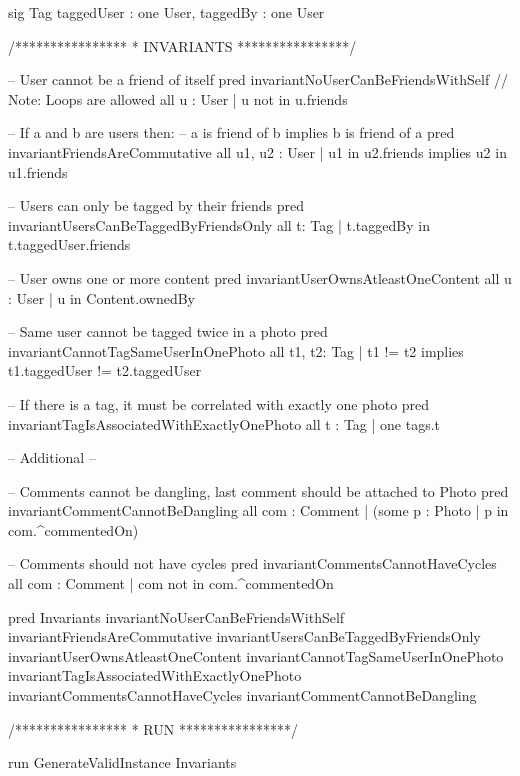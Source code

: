 \begin{enumerate}
\begin{alloy}
sig Tag {
    taggedUser : one User,
    taggedBy : one User
}

/****************
 * INVARIANTS 
 ****************/

-- User cannot be a friend of itself
pred invariantNoUserCanBeFriendsWithSelf {
  // Note: Loops are allowed
  all u : User | u not in u.friends
}

-- If a and b are users then:
-- a is friend of b implies b is friend of a
pred invariantFriendsAreCommutative {
  all u1, u2 : User | u1 in u2.friends implies u2 in u1.friends
}

-- Users can only be tagged by their friends
pred invariantUsersCanBeTaggedByFriendsOnly {
  all  t: Tag | t.taggedBy in t.taggedUser.friends
}

-- User owns one or more content
pred invariantUserOwnsAtleastOneContent {
  all u : User | u in Content.ownedBy
}

-- Same user cannot be tagged twice in a photo
pred invariantCannotTagSameUserInOnePhoto {
  all t1, t2: Tag | t1 != t2 implies t1.taggedUser != t2.taggedUser 
}

-- If there is a tag, it must be correlated with exactly one photo
pred invariantTagIsAssociatedWithExactlyOnePhoto {
  all t : Tag | one tags.t
}

-- Additional --

-- Comments cannot be dangling, last comment should be attached to Photo
pred invariantCommentCannotBeDangling {
  all com : Comment | (some p : Photo | p in com.^commentedOn)
}

-- Comments should not have cycles
pred invariantCommentsCannotHaveCycles {
  all com : Comment | com not in com.^commentedOn
}

pred Invariants {
  invariantNoUserCanBeFriendsWithSelf
  invariantFriendsAreCommutative
  invariantUsersCanBeTaggedByFriendsOnly
  invariantUserOwnsAtleastOneContent
  invariantCannotTagSameUserInOnePhoto
  invariantTagIsAssociatedWithExactlyOnePhoto
  invariantCommentsCannotHaveCycles
  invariantCommentCannotBeDangling
}

/****************
 * RUN 
 ****************/

run GenerateValidInstance {
  Invariants
}
          \end{alloy}
\end{enumerate}
